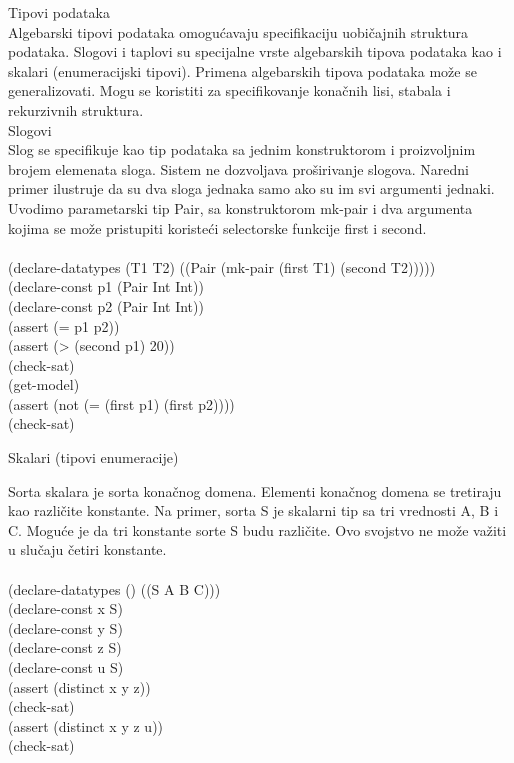 \documentclass[12pt,oneside]{memoir}
\begin{document}
Tipovi podataka
\\
Algebarski tipovi podataka omogućavaju specifikaciju uobičajnih struktura podataka. Slogovi i taplovi su specijalne vrste algebarskih tipova podataka kao i skalari (enumeracijski tipovi). Primena algebarskih tipova podataka može se generalizovati. Mogu se koristiti za specifikovanje konačnih lisi, stabala i rekurzivnih struktura. \\
Slogovi 
\\
Slog se specifikuje kao tip podataka sa jednim konstruktorom i proizvoljnim brojem elemenata sloga. Sistem ne dozvoljava proširivanje slogova. Naredni primer ilustruje da su dva sloga jednaka samo ako su im svi argumenti jednaki. Uvodimo parametarski tip Pair, sa konstruktorom mk-pair i dva argumenta kojima se može pristupiti koristeći selectorske funkcije first i second.
\\
\\(declare-datatypes (T1 T2) ((Pair (mk-pair (first T1) (second T2)))))
\\(declare-const p1 (Pair Int Int))
\\(declare-const p2 (Pair Int Int))
\\(assert (= p1 p2))
\\(assert (> (second p1) 20))
\\(check-sat)
\\(get-model)
\\(assert (not (= (first p1) (first p2))))
\\(check-sat)


Skalari (tipovi enumeracije)

Sorta skalara je sorta konačnog domena. Elementi konačnog domena se tretiraju kao različite konstante. Na primer, sorta S je skalarni tip sa tri vrednosti A, B i C. Moguće je da tri konstante sorte S budu različite. Ovo svojstvo ne može važiti u slučaju četiri konstante.
\\
\\(declare-datatypes () ((S A B C)))
\\(declare-const x S)
\\(declare-const y S)
\\(declare-const z S)
\\(declare-const u S)
\\(assert (distinct x y z))
\\(check-sat)
\\(assert (distinct x y z u))
\\(check-sat)
\\
\\
\end{document}
